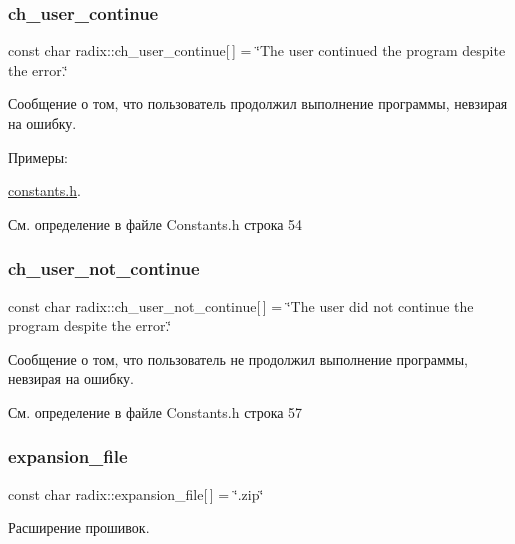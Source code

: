 \subsubsection{\texorpdfstring{ch\+\_\+user\+\_\+continue}{ch\_user\_continue}}
{\footnotesize\ttfamily const char radix\+::ch\+\_\+user\+\_\+continue\mbox{[}$\,$\mbox{]} = \char`\"{}The user continued the program despite the error.\char`\"{}}

Сообщение о том, что пользователь продолжил выполнение программы, невзирая на ошибку. \begin{Desc}
\item[Примеры\+: ]\par
\hyperlink{constants_8h-example}{constants.\+h}.\end{Desc}


См. определение в файле Constants.\+h строка 54

\mbox{\label{namespaceradix_afd1855af7805a1bb408ea9175a626ac7}} 
\subsubsection{\texorpdfstring{ch\+\_\+user\+\_\+not\+\_\+continue}{ch\_user\_not\_continue}}
{\footnotesize\ttfamily const char radix\+::ch\+\_\+user\+\_\+not\+\_\+continue\mbox{[}$\,$\mbox{]} = \char`\"{}The user did not continue the program despite the error.\char`\"{}}

Сообщение о том, что пользователь не продолжил выполнение программы, невзирая на ошибку. 

См. определение в файле Constants.\+h строка 57

\mbox{\label{namespaceradix_a01a09f0b88f6fd375ea20667bd318035}} 
\subsubsection{\texorpdfstring{expansion\+\_\+file}{expansion\_file}}
{\footnotesize\ttfamily const char radix\+::expansion\+\_\+file\mbox{[}$\,$\mbox{]} = \char`\"{}.zip\char`\"{}}

Расширение прошивок. 

